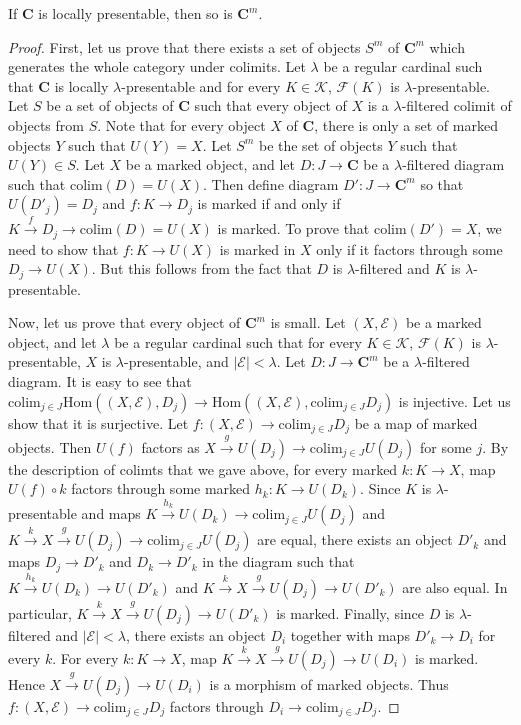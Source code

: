 \documentclass[reqno]{amsart}
\theoremstyle{definition}
\theoremstyle{remark}
\newcommand{\cat}[1]{\mathbf{#1}}
\newcommand{\C}{\cat{C}}
\newcommand{\Hom}{\mathrm{Hom}}
\newcommand{\colim}{\mathrm{colim}}
\numberwithin{figure}{section}
\begin{document}
\begin{prop}
If $\C$ is locally presentable, then so is $\C^m$.
\end{prop}
\begin{proof}
First, let us prove that there exists a set of objects $S^m$ of $\C^m$ which generates the whole category under colimits.
Let $\lambda$ be a regular cardinal such that $\C$ is locally $\lambda$-presentable and for every $K \in \mathcal{K}$, $\mathcal{F}(K)$ is $\lambda$-presentable.
Let $S$ be a set of objects of $\C$ such that every object of $X$ is a $\lambda$-filtered colimit of objects from $S$.
Note that for every object $X$ of $\C$, there is only a set of marked objects $Y$ such that $U(Y) = X$.
Let $S^m$ be the set of objects $Y$ such that $U(Y) \in S$.
Let $X$ be a marked object, and let $D : J \to \C$ be a $\lambda$-filtered diagram such that $\colim(D) = U(X)$.
Then define diagram $D' : J \to \C^m$ so that $U(D'_j) = D_j$ and $f : K \to D_j$ is marked if and only if $K \xrightarrow{f} D_j \to \colim(D) = U(X)$ is marked.
To prove that $\colim(D') = X$, we need to show that $f : K \to U(X)$ is marked in $X$ only if it factors through some $D_j \to U(X)$.
But this follows from the fact that $D$ is $\lambda$-filtered and $K$ is $\lambda$-presentable.

Now, let us prove that every object of $\C^m$ is small.
Let $(X,\mathcal{E})$ be a marked object, and let $\lambda$ be a regular cardinal such that
for every $K \in \mathcal{K}$, $\mathcal{F}(K)$ is $\lambda$-presentable, $X$ is $\lambda$-presentable, and $|\mathcal{E}| < \lambda$.
Let $D : J \to \C^m$ be a $\lambda$-filtered diagram.
It is easy to see that $\colim_{j \in J} \Hom((X,\mathcal{E}), D_j) \to \Hom((X,\mathcal{E}), \colim_{j \in J} D_j)$ is injective.
Let us show that it is surjective.
Let $f : (X,\mathcal{E}) \to \colim_{j \in J} D_j$ be a map of marked objects.
Then $U(f)$ factors as $X \xrightarrow{g} U(D_j) \to \colim_{j \in J} U(D_j)$ for some $j$.
By the description of colimts that we gave above, for every marked $k : K \to X$, map $U(f) \circ k$ factors through some marked $h_k : K \to U(D_k)$.
Since $K$ is $\lambda$-presentable and maps $K \xrightarrow{h_k} U(D_k) \to \colim_{j \in J} U(D_j)$
and $K \xrightarrow{k} X \xrightarrow{g} U(D_j) \to \colim_{j \in J} U(D_j)$ are equal,
there exists an object $D'_k$ and maps $D_j \to D'_k$ and $D_k \to D'_k$ in the diagram such that
$K \xrightarrow{h_k} U(D_k) \to U(D'_k)$ and $K \xrightarrow{k} X \xrightarrow{g} U(D_j) \to U(D'_k)$ are also equal.
In particular, $K \xrightarrow{k} X \xrightarrow{g} U(D_j) \to U(D'_k)$ is marked.
Finally, since $D$ is $\lambda$-filtered and $|\mathcal{E}| < \lambda$, there exists an object $D_i$ together with maps $D'_k \to D_i$ for every $k$.
For every $k : K \to X$, map $K \xrightarrow{k} X \xrightarrow{g} U(D_j) \to U(D_i)$ is marked.
Hence $X \xrightarrow{g} U(D_j) \to U(D_i)$ is a morphism of marked objects.
Thus $f : (X,\mathcal{E}) \to \colim_{j \in J} D_j$ factors through $D_i \to \colim_{j \in J} D_j$.
\end{proof}
\end{document}
